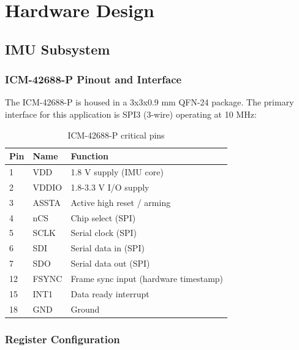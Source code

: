 
\chapter{Hardware Design} \label{chap:hardware}

\section{IMU Subsystem}

\subsection{ICM-42688-P Pinout and Interface}

The ICM-42688-P is housed in a 3x3x0.9 mm QFN-24 package. The primary interface for this application is SPI3 (3-wire) operating at 10 MHz:

\begin{table}[h]
    \centering
    \caption{ICM-42688-P critical pins}
    \label{tab:imu_pins}
    \begin{tabular}{lll}
        \toprule
        \textbf{Pin} & \textbf{Name} & \textbf{Function} \\
        \midrule
        1 & VDD & 1.8 V supply (IMU core) \\
        2 & VDDIO & 1.8-3.3 V I/O supply \\
        3 & ASSTA & Active high reset / arming \\
        4 & nCS & Chip select (SPI) \\
        5 & SCLK & Serial clock (SPI) \\
        6 & SDI & Serial data in (SPI) \\
        7 & SDO & Serial data out (SPI) \\
        12 & FSYNC & Frame sync input (hardware timestamp) \\
        15 & INT1 & Data ready interrupt \\
        18 & GND & Ground \\
        \bottomrule
    \end{tabular}
\end{table}

\subsection{Register Configuration}

